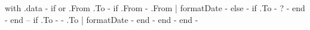 {{ with .data -}}
    {\small 
    {{ if or .From .To -}}
        {{ if .From -}}
            {{ .From | formatDate -}}
        {{ else -}}
            {{ if .To -}} ? {{- end -}}
        {{ end }} -- {{ if .To -}}
            {{- .To | formatDate -}}
        {{ end -}}
    {{ end -}}
    }
{{ end -}}
